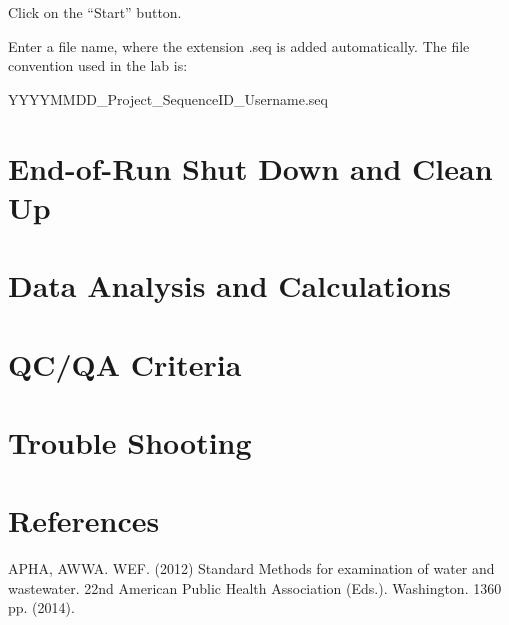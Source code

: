 \documentclass[12pt]{../SOP4_alpha}\usepackage[]{graphicx}\usepackage[]{color}
\begin{document}
\NP Click on the ``Start'' button.

\NP Enter a file name, where the extension .seq is added automatically. The file convention used in the lab is:

\medskip

YYYYMMDD\_Project\_SequenceID\_Username.seq

\section{End-of-Run Shut Down and Clean Up}

\NP

\section{Data Analysis and Calculations}

\section{QC/QA Criteria}

\section{Trouble Shooting}

\section{References}

\NP APHA, AWWA. WEF. (2012) Standard Methods for examination of water and wastewater. 22nd American Public Health Association (Eds.). Washington. 1360 pp. (2014).
\end{document}
